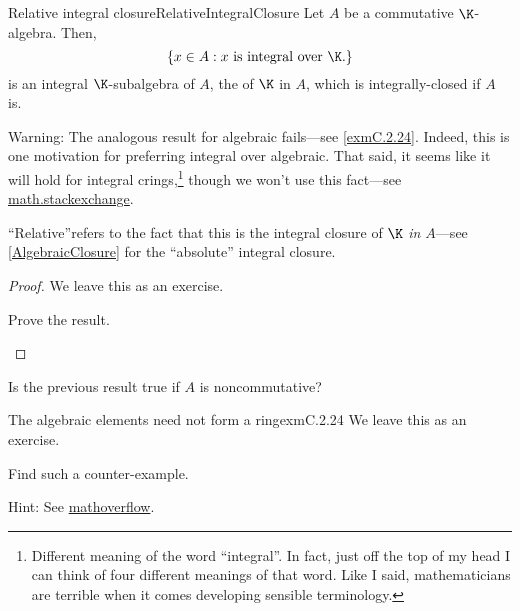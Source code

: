 \begin{prp}{Relative integral closure}{RelativeIntegralClosure}
	Let $A$ be a commutative $\K$-algebra.  Then,
	\begin{equation}
		\left\{ x\in A:x\text{ is integral over }\K \text{.}\right\}
	\end{equation}
	is an integral $\K$-subalgebra of $A$, the  of $\K$ in $A$, which is integrally-closed if $A$ is.
	\begin{rmk}
		Warning:  The analogous result for algebraic fails---see \cref{exmC.2.24}.  Indeed, this is one motivation for preferring integral over algebraic.  That said, it seems like it will hold for integral crings,\footnote{Different meaning of the word ``integral''.  In fact, just off the top of my head I can think of four different meanings of that word.  Like I said, mathematicians are terrible when it comes developing sensible terminology.} though we won't use this fact---see \href{https://math.stackexchange.com/questions/759345/algebraic-vs-integral-closure-of-a-ring?rq=1}{math.stackexchange}.
	\end{rmk}
	\begin{rmk}
		``Relative''refers to the fact that this is the integral closure of $\K$ \emph{in $A$}---see \cref{AlgebraicClosure} for the ``absolute'' integral closure.  
	\end{rmk}
	\begin{proof}
		We leave this as an exercise.
		\begin{exr}[breakable=false]{}{}
			Prove the result.
		\end{exr}
	\end{proof}
\end{prp}
\begin{exr}{}{}
	Is the previous result true if $A$ is noncommutative?
\end{exr}
\begin{exm}{The algebraic elements need not form a ring}{exmC.2.24}
	We leave this as an exercise.
	\begin{exr}[breakable=false]{}{}
		Find such a counter-example.
		\begin{rmk}
			Hint:  See \href{https://mathoverflow.net/questions/163749/algebraic-closure-of-a-ring-is-not-a-ring}{mathoverflow}.
		\end{rmk}
	\end{exr}
\end{exm}

